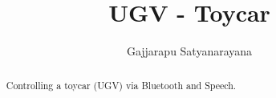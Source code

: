 \documentclass[conference]{IEEEtran}
\begin{document}

\title{ 
	\textbf{UGV - Toycar}
}
\author{Gajjarapu Satyanarayana}

\maketitle

\tableofcontents

\renewcommand{\thefigure}{\theenumi}
\renewcommand{\thetable}{\theenumi}

\bigskip

\begin{abstract}
Controlling a toycar (UGV) via Bluetooth and Speech.
\end{abstract}
\end{document}
